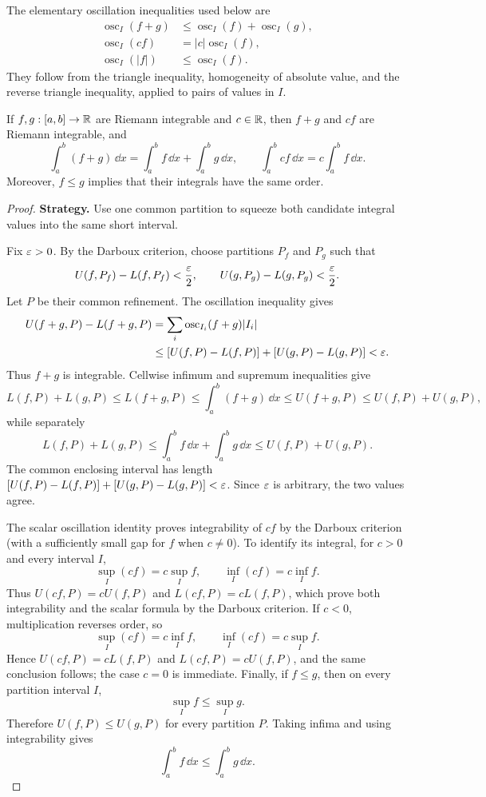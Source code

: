 

The elementary oscillation inequalities used below are
\[
\begin{aligned}
\operatorname{osc}_I(f+g)&\leq\operatorname{osc}_I(f)+\operatorname{osc}_I(g),\\
\operatorname{osc}_I(cf)&=|c|\operatorname{osc}_I(f),\\
\operatorname{osc}_I(|f|)&\leq\operatorname{osc}_I(f).
\end{aligned}
\]
They follow from the triangle inequality, homogeneity of absolute value,
and the reverse triangle inequality, applied to pairs of values in $I$.

\begin{theorem}
\label{thm:integral-properties}
If $f,g:[a,b]\to\mathbb{R}$ are Riemann integrable and $c\in\mathbb{R}$, then $f+g$ and $cf$ are Riemann integrable, and
\[
\int_a^b(f+g)\,\dd x=\int_a^b f\,\dd x+\int_a^b g\,\dd x,
\qquad
\int_a^b cf\,\dd x=c\int_a^b f\,\dd x.
\]
Moreover, $f\leq g$ implies that their integrals have the same order.
\end{theorem}
\begin{proof}
\textbf{Strategy.} Use one common partition to squeeze both candidate
integral values into the same short interval.

Fix $\varepsilon>0$. By the Darboux criterion, choose partitions $P_f$ and $P_g$ such that
\[
U(f,P_f)-L(f,P_f)<\frac{\varepsilon}{2},
\qquad
U(g,P_g)-L(g,P_g)<\frac{\varepsilon}{2}.
\]
Let $P$ be their common refinement. The oscillation inequality gives
\[
\begin{aligned}
U(f+g,P)-L(f+g,P)
&=\sum_i\operatorname{osc}_{I_i}(f+g)|I_i|\\
&\leq[U(f,P)-L(f,P)]+[U(g,P)-L(g,P)]<\varepsilon.
\end{aligned}
\]
Thus $f+g$ is integrable. Cellwise infimum and supremum inequalities give
\[
L(f,P)+L(g,P)\leq L(f+g,P)
\leq\int_a^b(f+g)\,\dd x
\leq U(f+g,P)\leq U(f,P)+U(g,P),
\]
while separately
\[
L(f,P)+L(g,P)\leq
\int_a^b f\,\dd x+\int_a^b g\,\dd x
\leq U(f,P)+U(g,P).
\]
The common enclosing interval has length
$[U(f,P)-L(f,P)]+[U(g,P)-L(g,P)]<\varepsilon$.
Since $\varepsilon$ is arbitrary, the two values agree.

The scalar oscillation identity proves integrability of $cf$ by the Darboux
criterion (with a sufficiently small gap for $f$ when $c\ne0$).
To identify its integral, for $c>0$ and every interval $I$,
\[
\sup_I(cf)=c\sup_I f,
\qquad
\inf_I(cf)=c\inf_I f.
\]
Thus $U(cf,P)=cU(f,P)$ and $L(cf,P)=cL(f,P)$, which prove both
integrability and the scalar formula by the Darboux criterion.  If $c<0$,
multiplication reverses order, so
\[
\sup_I(cf)=c\inf_I f,
\qquad
\inf_I(cf)=c\sup_I f.
\]
Hence $U(cf,P)=cL(f,P)$ and $L(cf,P)=cU(f,P)$, and the same conclusion
follows; the case $c=0$ is immediate. Finally, if $f\leq g$, then on every
partition interval $I$,
\[
\sup_I f\leq\sup_I g.
\]
Therefore $U(f,P)\leq U(g,P)$ for every partition $P$. Taking infima and
using integrability gives
\[
\int_a^b f\,\dd x\leq\int_a^b g\,\dd x.
\]
\end{proof}

